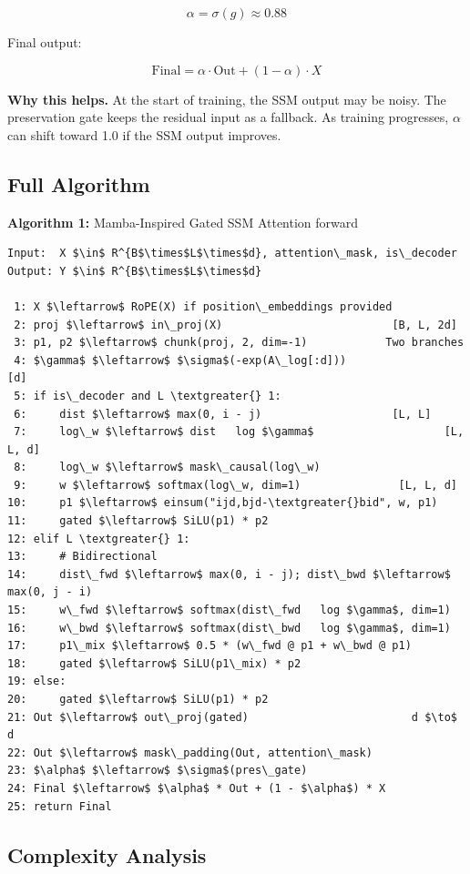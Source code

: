 \[
\alpha = \sigma(g) \approx 0.88
\tag{4.13}
\]

Final output:

\[
\text{Final} = \alpha \cdot \text{Out} + (1 - \alpha) \cdot X
\tag{4.14}
\]

\textbf{Why this helps.} At the start of training, the SSM output may be noisy. 
The preservation gate keeps the residual input as a fallback. As training 
progresses, $\alpha$ can shift toward 1.0 if the SSM output improves.

\subsection{Full Algorithm}

\textbf{Algorithm 1:} Mamba-Inspired Gated SSM Attention forward
\begin{lstlisting}
Input:  X $\in$ R^{B$\times$L$\times$d}, attention\_mask, is\_decoder
Output: Y $\in$ R^{B$\times$L$\times$d}

 1: X $\leftarrow$ RoPE(X) if position\_embeddings provided
 2: proj $\leftarrow$ in\_proj(X)                          [B, L, 2d]
 3: p1, p2 $\leftarrow$ chunk(proj, 2, dim=-1)            Two branches
 4: $\gamma$ $\leftarrow$ $\sigma$(-exp(A\_log[:d]))                      [d]
 5: if is\_decoder and L \textgreater{} 1:
 6:     dist $\leftarrow$ max(0, i - j)                    [L, L]
 7:     log\_w $\leftarrow$ dist   log $\gamma$                    [L, L, d]
 8:     log\_w $\leftarrow$ mask\_causal(log\_w)
 9:     w $\leftarrow$ softmax(log\_w, dim=1)               [L, L, d]
10:     p1 $\leftarrow$ einsum("ijd,bjd-\textgreater{}bid", w, p1)
11:     gated $\leftarrow$ SiLU(p1) * p2
12: elif L \textgreater{} 1:
13:     # Bidirectional
14:     dist\_fwd $\leftarrow$ max(0, i - j); dist\_bwd $\leftarrow$ max(0, j - i)
15:     w\_fwd $\leftarrow$ softmax(dist\_fwd   log $\gamma$, dim=1)
16:     w\_bwd $\leftarrow$ softmax(dist\_bwd   log $\gamma$, dim=1)
17:     p1\_mix $\leftarrow$ 0.5 * (w\_fwd @ p1 + w\_bwd @ p1)
18:     gated $\leftarrow$ SiLU(p1\_mix) * p2
19: else:
20:     gated $\leftarrow$ SiLU(p1) * p2
21: Out $\leftarrow$ out\_proj(gated)                         d $\to$ d
22: Out $\leftarrow$ mask\_padding(Out, attention\_mask)
23: $\alpha$ $\leftarrow$ $\sigma$(pres\_gate)
24: Final $\leftarrow$ $\alpha$ * Out + (1 - $\alpha$) * X
25: return Final
\end{lstlisting}

\subsection{Complexity Analysis}

